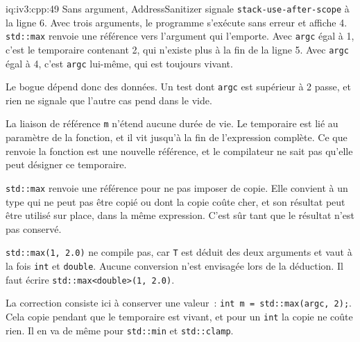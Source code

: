 \begin{solution}{iq:iv3:cpp:49}
Sans argument, AddressSanitizer signale \texttt{stack-use-after-scope} à la ligne 6. Avec trois arguments, le programme s'exécute sans erreur et affiche 4. \texttt{std::max} renvoie une référence vers l'argument qui l'emporte. Avec \texttt{argc} égal à 1, c'est le temporaire contenant 2, qui n'existe plus à la fin de la ligne 5. Avec \texttt{argc} égal à 4, c'est \texttt{argc} lui-même, qui est toujours vivant.

Le bogue dépend donc des données. Un test dont \texttt{argc} est supérieur à 2 passe, et rien ne signale que l'autre cas pend dans le vide.

La liaison de référence \texttt{m} n'étend aucune durée de vie. Le temporaire est lié au paramètre de la fonction, et il vit jusqu'à la fin de l'expression complète. Ce que renvoie la fonction est une nouvelle référence, et le compilateur ne sait pas qu'elle peut désigner ce temporaire.

\texttt{std::max} renvoie une référence pour ne pas imposer de copie. Elle convient à un type qui ne peut pas être copié ou dont la copie coûte cher, et son résultat peut être utilisé sur place, dans la même expression. C'est sûr tant que le résultat n'est pas conservé.

\texttt{std::max(1, 2.0)} ne compile pas, car \texttt{T} est déduit des deux arguments et vaut à la fois \texttt{int} et \texttt{double}. Aucune conversion n'est envisagée lors de la déduction. Il faut écrire \texttt{std::max<double>(1, 2.0)}.

La correction consiste ici à conserver une valeur~: \texttt{int m = std::max(argc, 2);}. Cela copie pendant que le temporaire est vivant, et pour un \texttt{int} la copie ne coûte rien. Il en va de même pour \texttt{std::min} et \texttt{std::clamp}.

\end{solution}

